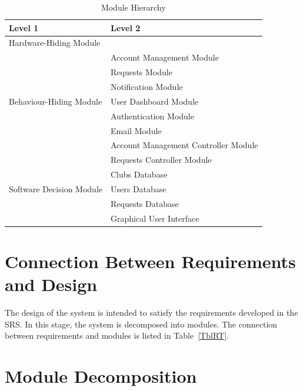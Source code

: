 \documentclass[12pt, titlepage]{article}
\begin{document}
\begin{table}[h!]
\centering
\begin{tabular}{p{} p{}}
\toprule
\textbf{Level 1} & \textbf{Level 2}\\
\midrule

{Hardware-Hiding Module} & ~ \\
\midrule

\multirow{7}{0.3\textwidth}{Behaviour-Hiding Module} 
& Account Management Module\\
& Requests Module\\
& Notification Module\\
& User Dashboard Module\\
& Authentication Module\\
& Email Module\\
& Account Management Controller Module\\
& Requests Controller Module\\
\midrule

\multirow{3}{0.3\textwidth}{Software Decision Module} 
& Clubs Database\\
& Users Database\\
& Requests Database\\
& Graphical User Interface\\
\bottomrule

\end{tabular}
\caption{Module Hierarchy}
\label{TblMH}
\end{table}

\section{Connection Between Requirements and Design} \label{SecConnection}

The design of the system is intended to satisfy the requirements developed in
the SRS. In this stage, the system is decomposed into modules. The connection
between requirements and modules is listed in Table~\ref{TblRT}.


\section{Module Decomposition} \label{SecMD}
\end{document}

